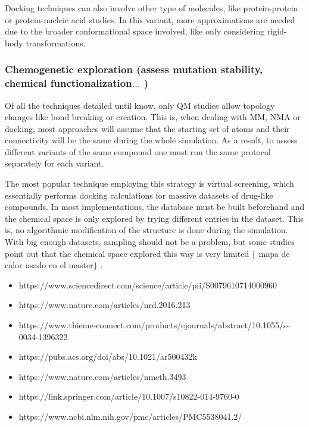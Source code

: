 Docking techniques can also involve other type of molecules, like protein-protein or protein-nucleic acid studies. In this variant, more approximations are needed due to the broader conformational space involved, like only considering rigid-body transformations.

\subsubsection{Chemogenetic exploration (assess mutation stability, chemical functionalization$ \ldots $ )}
Of all the techniques detailed until know, only QM studies allow topology changes like bond breaking or creation. This is, when dealing with MM, NMA or docking, most approaches will assume that the starting set of atoms and their connectivity will be the same during the whole simulation. As a result, to assess different variants of the same compound one must run the same protocol separately for each variant.

The most popular technique employing this strategy is virtual screening, which essentially performs docking calculations for massive datasets of drug-like compounds. In most implementations, the database must be built beforehand and the chemical space is only explored by trying different entries in the dataset. This is, no algorithmic modification of the structure is done during the simulation. With big enough datasets, sampling should not be a problem, but some studies point out that the chemical space explored this way is very limited $ \{ $ mapa de calor usado en el master$ \} $ .



\begin{itemize}
	\item https://www.sciencedirect.com/science/article/pii/S0079610714000960

	\item https://www.nature.com/articles/nrd.2016.213

	\item https://www.thieme-connect.com/products/ejournals/abstract/10.1055/s-0034-1396322

	\item https://pubs.acs.org/doi/abs/10.1021/ar500432k

	\item https://www.nature.com/articles/nmeth.3493

	\item https://link.springer.com/article/10.1007/s10822-014-9760-0

	\item https://www.ncbi.nlm.nih.gov/pmc/articles/PMC5538041.2/
\end{itemize}

